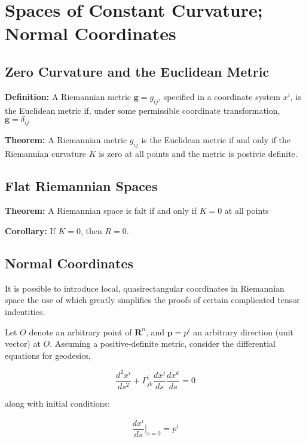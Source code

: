 \documentclass{article}
\begin{document}
%
%
\newpage
\section{Spaces of Constant Curvature; Normal Coordinates}

\subsection{Zero Curvature and the Euclidean Metric}

\noindent \textbf{Definition: }
A Riemannian metric $\mathbf{ g } = g_{ij}$, specified in a coordinate system $x^i$, is the Euclidean metric if, under some permissible coordinate transformation, $\overline{ \mathbf{ g } } = \delta_{ij}$

\noindent \textbf{Theorem: }
A Riemannian metric $g_{ij}$ is the Euclidean metric if and only if the Riemannian curvature $K$ is zero at all points and the metric is postivie definite.

\subsection{Flat Riemannian Spaces}

\noindent \textbf{Theorem: }
A Riemannian space is falt if and only if $K = 0$ at all points

\noindent \textbf{Corollary: }
If $K = 0$, then $R = 0$.

\subsection{Normal Coordinates}

It is possible to introduce local, quasirectangular coordinates in Riemannian space the use of which greatly simplifies the proofs of certain complicated tensor indentities.

Let $O$ denote an arbitrary point of $\mathbf{ R }^n$, and $\mathbf{ p } = p^i$ an arbitrary direction (unit vector) at $O$.  Assuming a positive-definite metric, consider the differential equations for geodesics,

\begin{equation}
	\frac{ d^2 x^i }{ ds^2 } + \Gamma^i_{jk} \frac{ dx^j }{ ds } \frac{ dx^k }{ ds } = 0
\end{equation}

along with initial conditions:

\begin{equation}
	\frac{ dx^i }{ ds } |_{s=0} = p^i
\end{equation}
\end{document}
